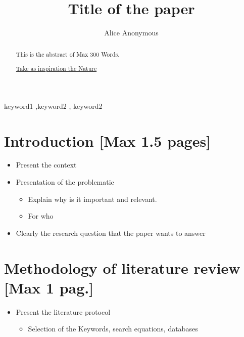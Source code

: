 \documentclass[preprint, 3p,
authoryear]{elsarticle} %
\providecommand{\tightlist}{%
  \setlength{\itemsep}{0pt}\setlength{\parskip}{0pt}}
\begin{document}
\begin{frontmatter}

  \title{Title of the paper}
    \author[ENSGSI]{Alice Anonymous%
  }
  
  \begin{abstract}
  This is the abstract of Max 300 Words.

  \href{http://www.cbs.umn.edu/sites/default/files/public/downloads/Annotated_Nature_abstract.pdf}{Take
  as inspiration the Nature}
  \end{abstract}
    \begin{keyword}
    keyword1 \sep keyword2 \sep 
    keyword2
  \end{keyword}
  
 \end{frontmatter}

\hypertarget{introduction-max-1.5-pages}{%
\section{Introduction {[}Max 1.5
pages{]}}\label{introduction-max-1.5-pages}}

\begin{itemize}
\tightlist
\item
  Present the context
\item
  Presentation of the problematic

  \begin{itemize}
  \tightlist
  \item
    Explain why is it important and relevant.
  \item
    For who
  \end{itemize}
\item
  Clearly the research question that the paper wants to answer
\end{itemize}

\hypertarget{methodology-of-literature-review-max-1-pag.}{%
\section{Methodology of literature review {[}Max 1
pag.{]}}\label{methodology-of-literature-review-max-1-pag.}}

\begin{itemize}
\tightlist
\item
  Present the literature protocol

  \begin{itemize}
  \tightlist
  \item
    Selection of the Keywords, search equations, databases
  \end{itemize}
\end{itemize}
\end{document}
